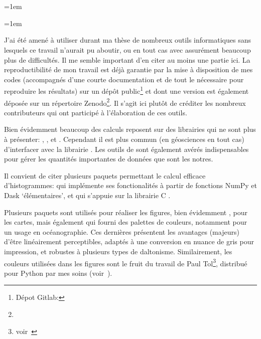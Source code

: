 \chapter*{\bibname}
\mtcaddchapter[\bibname]
\markboth{\bibname}{}
\label{bib}

{
  \emergencystretch=1em
  \printbibliography[heading=none, filter=normal]
}

\unsection{\bibdataTitle}
\markright{\bibdataTitle}
\label{bib:data}

{
  \emergencystretch=1em
  \printbibliography[heading=none, type=dataset]
}

\unsection{\bibsoftwareTitle}
\markright{\bibsoftwareTitle}
\label{bib:software}

J'ai été amené à utiliser durant ma thèse de nombreux outils informatiques sans lesquels ce travail n'aurait pu aboutir, ou en tout cas avec assurément beaucoup plus de difficultés.
Il me semble important d'en citer au moins une partie ici.
La reproductibilité de mon travail est déjà garantie par la mise à disposition de mes codes (accompagnés d'une courte documentation et de tout le nécessaire pour reproduire les résultats) sur un dépôt public\footnote{%
  Dépot Gitlab: }
et dont une version est également déposée sur un répertoire Zenodo\footnote{}.
Il s'agit ici plutôt de créditer les nombreux contributeurs qui ont participé à l'élaboration de ces outils.

Bien évidemment beaucoup des calculs reposent sur des librairies qui ne sont plus à présenter: , , et .
Cependant il est plus commun (en géosciences en tout cas) d'interfacer avec la librairie .
Les outils de  sont également avérés indispensables pour gérer les quantités importantes de données que sont les notres.

Il convient de citer plusieurs paquets permettant le calcul efficace d'histogrammes:
 qui implémente ses fonctionalités à partir de fonctions NumPy et Dask \enquote*{élémentaires}, et
 qui s'appuie sur la librairie C .

Plusieurs paquets sont utilisés pour réaliser les figures, bien évidemment ,
 pour les cartes,
mais également  qui fourni des palettes de couleurs, notamment pour un usage en océanographie. Ces dernières présentent les avantages (majeurs) d'être linéairement perceptibles, adaptés à une conversion en nuance de gris pour impression, et robustes à plusieurs types de daltonisme.
Similairement, les couleurs utilisées dans les figures sont le fruit du travail de Paul Tol\footnote{voir~}, distribué pour Python par mes soins (voir~).

